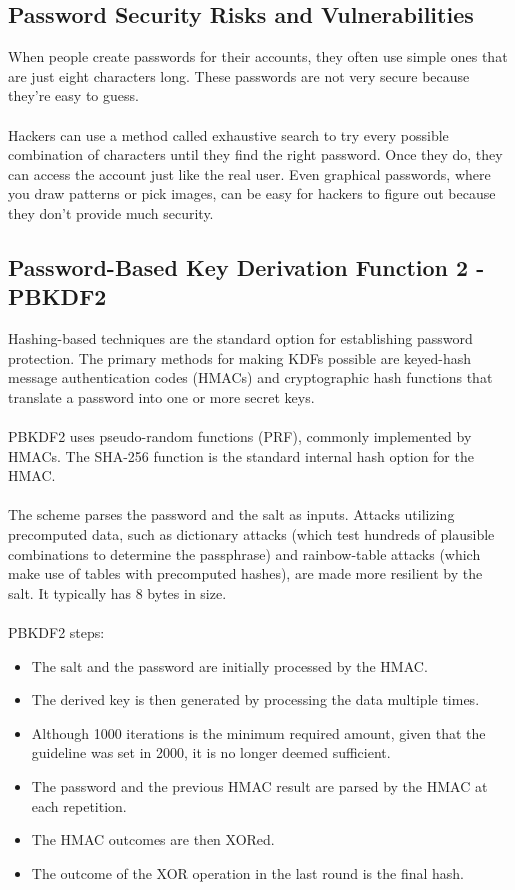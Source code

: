 \documentclass[10pt,oneside,english,a4paper]{article}
\begin{document}
\subsection{Password Security Risks and Vulnerabilities}
When people create passwords for their accounts, they often use simple ones that are just eight characters long. These passwords are not very secure because they're easy to guess. 
\\\\
Hackers can use a method called exhaustive search to try every possible combination of characters until they find the right password. Once they do, they can access the account just like the real user. Even graphical passwords, where you draw patterns or pick images, can be easy for hackers to figure out because they don't provide much security.

\subsection{Password-Based Key Derivation Function 2 - PBKDF2}
Hashing-based techniques are the standard option for establishing password protection. The primary methods for making KDFs possible are keyed-hash message authentication codes (HMACs) and cryptographic hash functions that translate a password into one or more secret keys.
\\\\
PBKDF2 uses pseudo-random functions (PRF), commonly implemented by HMACs.
The SHA-256 function is the standard internal hash option for the HMAC. 
\\\\
The scheme parses the password and the salt as inputs.
Attacks utilizing precomputed data, such as dictionary attacks (which test hundreds of plausible combinations to determine the passphrase) and rainbow-table attacks (which make use of tables with precomputed hashes), are made more resilient by the salt. 
It typically has 8 bytes in size.\\\\
PBKDF2 steps:

\begin{itemize}
\item The salt and the password are initially processed by the HMAC. 
\item The derived key is then generated by processing the data multiple times.
\item Although 1000 iterations is the minimum required amount, given that the guideline was set in 2000, it is no longer deemed sufficient. 
\item The password and the previous HMAC result are parsed by the HMAC at each repetition.  
\item The HMAC outcomes are then XORed.
\item The outcome of the XOR operation in the last round is the final hash.
\end{itemize}
\end{document}
